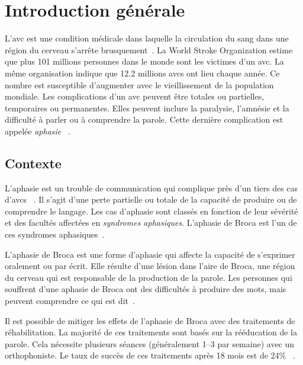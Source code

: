 \chapter*{Introduction générale}
\label{chap.intro}

L'\gls{avc} est une condition médicale dans laquelle 
la circulation du sang dans une région du cerveau s'arrête brusquement~\cite{Larousse}.
La \foreignlanguage{english}{World Stroke Organization} estime que 
plus 101 millions personnes dans le monde sont les victimes d'un \gls{avc}.
La même organisation indique que 12.2 millions \glspl{avc} ont lieu chaque année.
Ce nombre est susceptible d'augmenter avec le vieillissement de la population mondiale.
Les complications d'un \gls{avc} peuvent être totales ou partielles, temporaires ou permanentes.
Elles peuvent inclure la paralysie, l'amnésie et la difficulté à parler ou à comprendre la parole.
Cette dernière complication est appelée \emph{aphasie}%
~\cite{Feigin_Brainin_Norrving_Martins_Sacco_Hacke_Fisher_Pandian_Lindsay_2022}.


\section*{Contexte}

L'aphasie est un trouble de communication qui complique près d'un tiers des cas d'\glspl{avc}%
~\cite{Flowers_Skoretz_Silver_Rochon_Fang_Flamand-Roze_Martino_2016}.
Il s'agit d'une perte partielle ou totale de la capacité de produire ou de comprendre le langage.
Les cas d'aphasie sont classés en fonction de leur sévérité et des facultés affectées en \emph{syndromes aphasiques}.
L'aphasie de Broca est l'un de ces syndromes aphasiques~\cite{Chapey_2008}.

L'aphasie de Broca est une forme d'aphasie qui affecte la capacité de s'exprimer oralement ou par écrit.
Elle résulte d'une lésion dans l'aire de Broca,
une région du cerveau qui est responsable de la production de la parole.
Les personnes qui souffrent d'une aphasie de Broca ont des difficultés à produire des mots,
mais peuvent comprendre ce qui est dit~\cite{Chapey_2008}.

Il est possible de mitiger les effets de l'aphasie de Broca avec des traitements de réhabilitation.
La majorité de ces traitements sont basés sur la rééducation de la parole.
Cela nécessite plusieurs séances (généralement 1--3 par semaine) avec un orthophoniste.
Le taux de succès de ces traitements après 18 mois est de 24\%%
~\cite{Liu_Huang_Xu_Wu_Tao_Chen_2021,Laska_Hellblom_Murray_Kahan_Von_Arbin_2001,recover}.

